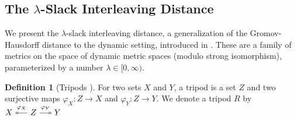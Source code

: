 \documentclass[a4paper,UKenglish,thm-restate]{article}
\theoremstyle{definition}
\newtheorem{definition}[theorem]{Definition}
\DeclareRobustCommand\longtwoheadrightarrow
     {\relbar\joinrel\twoheadrightarrow}
\DeclareRobustCommand\longtwoheadleftarrow
     {\twoheadleftarrow\joinrel\relbar}
\begin{document}
\renewcommand\refname{Bibliography}


\begin{appendices}
    \section{The $\lambda$-Slack Interleaving Distance} \label{app:lambdaslackdistance}
        We present the $\lambda$-slack interleaving distance, a generalization of the Gromov-Hausdorff distance to the dynamic setting, introduced in \cite{stablesignatures}. These are a family of metrics on the space of dynamic metric spaces (modulo strong isomorphism), parameterized by a number $\lambda \in [0, \infty)$.
    
        \begin{definition}[Tripods \cite{stablesignatures}]
            For two sets $X$ and $Y$, a tripod is a set $Z$ and two surjective maps $\varphi_X: Z \rightarrow X$ and $\varphi_Y: Z \rightarrow Y$. We denote a tripod $R$ by $X \overset{\varphi_X}{\longtwoheadleftarrow} Z \overset{\varphi_Y}{\longtwoheadrightarrow} Y$
        \end{definition}
    

\end{appendices}
\end{document}
